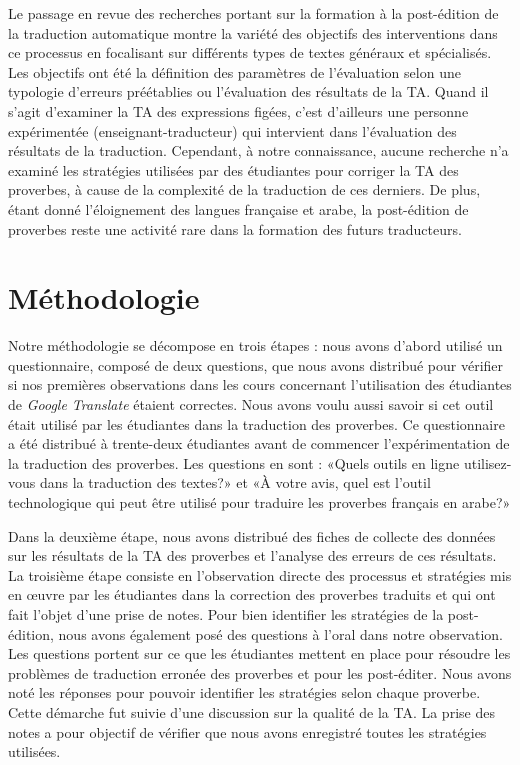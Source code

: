 \documentclass[french]{textolivre}
\begin{document}
Le passage en revue des recherches portant sur la formation à la post-édition de la traduction automatique montre la variété des objectifs des interventions dans ce processus en focalisant sur différents types de textes généraux et spécialisés. Les objectifs ont été la définition des paramètres de l’évaluation selon une typologie d’erreurs préétablies ou l’évaluation des résultats de la TA. Quand il s’agit d’examiner la TA des expressions figées, c’est d’ailleurs une personne expérimentée (enseignant-traducteur) qui intervient dans l’évaluation des résultats de la traduction. Cependant, à notre connaissance, aucune recherche n’a examiné les stratégies utilisées par des étudiantes pour corriger la TA des proverbes, à cause de la complexité de la traduction de ces derniers. De plus, étant donné l’éloignement des langues française et arabe, la post-édition de proverbes reste une activité rare dans la formation des futurs traducteurs.


\section{Méthodologie}\label{sec-fmt-manuscrito}
Notre méthodologie se décompose en trois étapes : nous avons d’abord utilisé un questionnaire, composé de deux questions, que nous avons distribué pour vérifier si nos premières observations dans les cours concernant l’utilisation des étudiantes de \textit{Google Translate} étaient correctes. Nous avons voulu aussi savoir si cet outil était utilisé par les étudiantes dans la traduction des proverbes. Ce questionnaire a été distribué à trente-deux étudiantes avant de commencer l’expérimentation de la traduction des proverbes. Les questions en sont : «Quels outils en ligne utilisez-vous dans la traduction des textes?» et «À votre avis, quel est l’outil technologique qui peut être utilisé pour traduire les proverbes français en arabe?»

Dans la deuxième étape, nous avons distribué des fiches de collecte des données sur les résultats de la TA des proverbes et l’analyse des erreurs de ces résultats. La troisième étape consiste en l’observation directe des processus et stratégies mis en œuvre par les étudiantes dans la correction des proverbes traduits et qui ont fait l’objet d’une prise de notes. Pour bien identifier les stratégies de la post-édition, nous avons également posé des questions à l’oral dans notre observation. Les questions portent sur ce que les étudiantes mettent en place pour résoudre les problèmes de traduction erronée des proverbes et pour les post-éditer. Nous avons noté les réponses pour pouvoir identifier les stratégies selon chaque proverbe. Cette démarche fut suivie d’une discussion sur la qualité de la TA. La prise des notes a pour objectif de vérifier que nous avons enregistré toutes les stratégies utilisées. 
\end{document}

